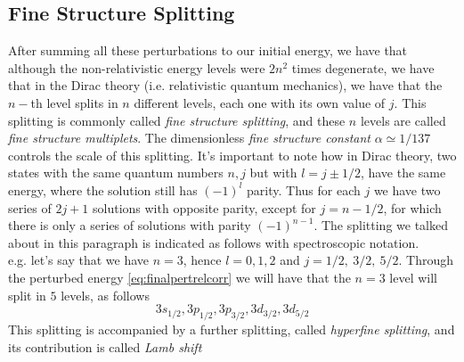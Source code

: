 \documentclass[a4paper, 11pt]{book}
\newcommand{\1}{\opr{\mathds{1}}}
\theoremstyle{plain}
\begin{document}
	\subsection{Fine Structure Splitting}
	After summing all these perturbations to our initial energy, we have that although the non-relativistic energy levels were $2n^2$ times degenerate, we have that in the Dirac theory (i.e. relativistic quantum mechanics), we have that the $n-$th level splits in $n$ different levels, each one with its own value of $j$. This splitting is commonly called \textit{fine structure splitting}, and these $n$ levels are called \textit{fine structure multiplets}. The dimensionless \textit{fine structure constant} $\alpha\simeq1/137$ controls the scale of this splitting. It's important to note how in Dirac theory, two states with the same quantum numbers $n,j$ but with $l=j\pm1/2$, have the same energy, where the solution still has $(-1)^l$ parity. Thus for each $j$ we have two series of $2j+1$ solutions with opposite parity, except for $j=n-1/2$, for which there is only a series of solutions with parity $(-1)^{n-1}$. The splitting we talked about in this paragraph is indicated as follows with spectroscopic notation.\\
	e.g. let's say that we have $n=3$, hence $l=0,1,2$ and $j=1/2,\ 3/2,\ 5/2$. Through the perturbed energy \eqref{eq:finalpertrelcorr} we will have that the $n=3$ level will split in $5$ levels, as follows
	\begin{equation*}
		3s_{1/2},3p_{1/2},3p_{3/2},3d_{3/2},3d_{5/2}
	\end{equation*}
	This splitting is accompanied by a further splitting, called \textit{hyperfine splitting}, and its contribution is called \textit{Lamb shift}
\end{document}

